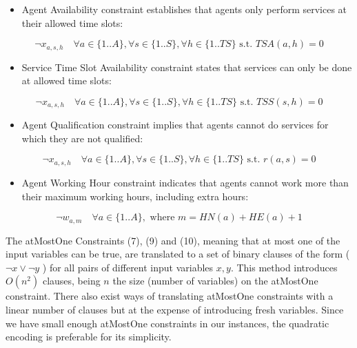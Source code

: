 \documentclass[10pt]{article}
\begin{document}
\begin{itemize}
  \item Agent Availability constraint establishes that agents only perform services at their allowed time slots:
\end{itemize}


\begin{equation*}
\neg x_{a, s, h} \quad \forall a \in\{1 . . A\}, \forall s \in\{1 . . S\}, \forall h \in\{1 . . T S\} \text { s.t. } T S A(a, h)=0 \tag{11}
\end{equation*}


\begin{itemize}
  \item Service Time Slot Availability constraint states that services can only be done at allowed time slots:
\end{itemize}


\begin{equation*}
\neg x_{a, s, h} \quad \forall a \in\{1 . . A\}, \forall s \in\{1 . . S\}, \forall h \in\{1 . . T S\} \text { s.t. } T S S(s, h)=0 \tag{12}
\end{equation*}


\begin{itemize}
  \item Agent Qualification constraint implies that agents cannot do services for which they are not qualified:
\end{itemize}


\begin{equation*}
\neg x_{a, s, h} \quad \forall a \in\{1 . . A\}, \forall s \in\{1 . . S\}, \forall h \in\{1 . . T S\} \text { s.t. } r(a, s)=0 \tag{13}
\end{equation*}


\begin{itemize}
  \item Agent Working Hour constraint indicates that agents cannot work more than their maximum working hours, including extra hours:
\end{itemize}


\begin{equation*}
\neg w_{a, m} \quad \forall a \in\{1 . . A\}, \text { where } m=H N(a)+H E(a)+1 \tag{14}
\end{equation*}


The atMostOne Constraints (7), (9) and (10), meaning that at most one of the input variables can be true, are translated to a set of binary clauses of the form ( $\neg x \vee \neg y$ ) for all pairs of different input variables $x, y$. This method introduces $O\left(n^{2}\right)$ clauses, being $n$ the size (number of variables) on the atMostOne constraint. There also exist ways of translating atMostOne constraints with a linear number of clauses but at the expense of introducing fresh variables. Since we have small enough atMostOne constraints in our instances, the quadratic encoding is preferable for its simplicity.
\end{document}
